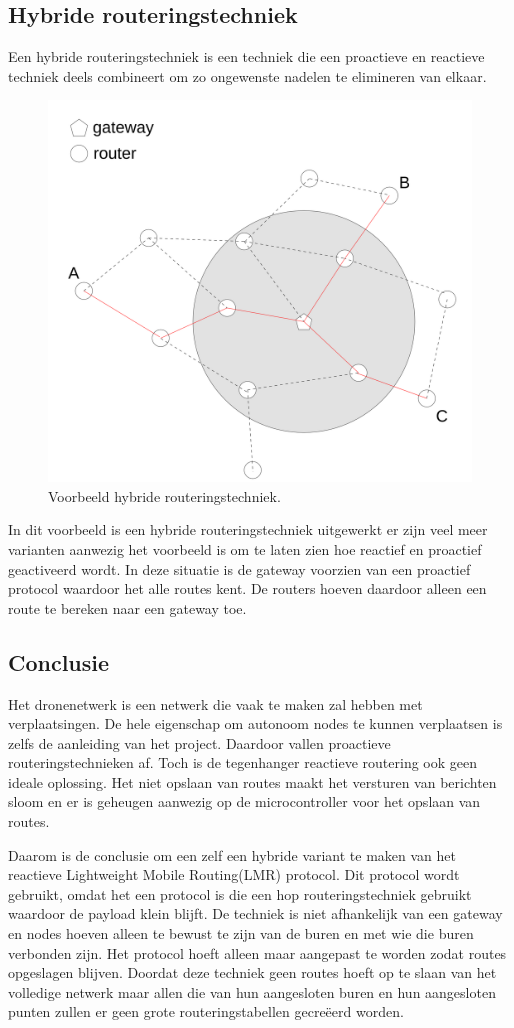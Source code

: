 \documentclass[a4paper, 11pt, oneside]{report}
\begin{document}
\subsection{Hybride routeringstechniek}
\label{sec:meshnetwerktechniek:hybride}
Een hybride routeringstechniek is een techniek die een proactieve en reactieve techniek deels combineert om zo ongewenste nadelen te elimineren van elkaar. 

\begin{figure}[H]
	\begin{center}\includegraphics[width=0.45\linewidth]{Afbeeldingen/hybride.png}\end{center}
	\caption{Voorbeeld hybride routeringstechniek.}
	\label{fig:hybride}
\end{figure}

In dit voorbeeld is een hybride routeringstechniek uitgewerkt er zijn veel meer varianten aanwezig het voorbeeld is om te laten zien hoe reactief en proactief geactiveerd wordt.
In deze situatie is de gateway voorzien van een proactief protocol waardoor het alle routes kent. 
De routers hoeven daardoor alleen een route te bereken naar een gateway toe.   
  
\subsection{Conclusie}
\label{sec:meshnetwerktechniek:Conlusie}
Het dronenetwerk is een netwerk die vaak te maken zal hebben met verplaatsingen.
De hele eigenschap om autonoom nodes te kunnen verplaatsen is zelfs de aanleiding van het project.
Daardoor vallen proactieve routeringstechnieken af. 
Toch is de tegenhanger reactieve routering ook geen ideale oplossing.
Het niet opslaan van routes maakt het versturen van berichten sloom en er is geheugen aanwezig op de microcontroller voor het opslaan van routes. 

Daarom is de conclusie om een zelf een hybride variant te maken van het reactieve Lightweight Mobile Routing(LMR) protocol.
Dit protocol wordt gebruikt, omdat het een protocol is die een hop routeringstechniek gebruikt waardoor de payload klein blijft.
De techniek is niet afhankelijk van een gateway en nodes hoeven alleen te bewust te zijn van de buren en met wie die buren verbonden zijn.
Het protocol hoeft alleen maar aangepast te worden zodat routes opgeslagen blijven.
Doordat deze techniek geen routes hoeft op te slaan van het volledige netwerk  maar allen die van hun aangesloten buren en hun aangesloten punten zullen er geen grote routeringstabellen gecreëerd worden.
\end{document}
